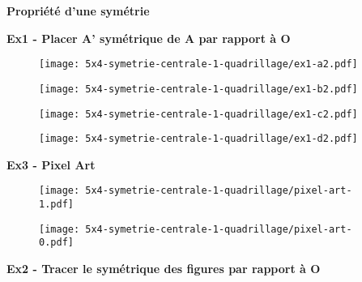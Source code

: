 \textbf{Propriété d'une symétrie} \\ \Pointilles[2]

\textbf{Ex1 - Placer A' symétrique de A par rapport à O}


\begin{multicols}{2}
  
\begin{figure}[H]
  \centering
  \texttt{[image: 5x4-symetrie-centrale-1-quadrillage/ex1-a2.pdf]}
\end{figure}

\begin{figure}[H]
  \centering
  \texttt{[image: 5x4-symetrie-centrale-1-quadrillage/ex1-b2.pdf]}
\end{figure}

\begin{figure}[H]
  \centering
  \texttt{[image: 5x4-symetrie-centrale-1-quadrillage/ex1-c2.pdf]}
\end{figure}

\begin{figure}[H]
  \centering
  \texttt{[image: 5x4-symetrie-centrale-1-quadrillage/ex1-d2.pdf]}
\end{figure}

\end{multicols}

\textbf{Ex3 - Pixel Art}

\begin{multicols}{2}

\begin{figure}[H]
  \centering
  \texttt{[image: 5x4-symetrie-centrale-1-quadrillage/pixel-art-1.pdf]}
\end{figure}

\begin{figure}[H]
  \centering
  \texttt{[image: 5x4-symetrie-centrale-1-quadrillage/pixel-art-0.pdf]}
\end{figure}

\end{multicols}

\newpage 

\textbf{Ex2 - Tracer le symétrique des figures par rapport à O}

